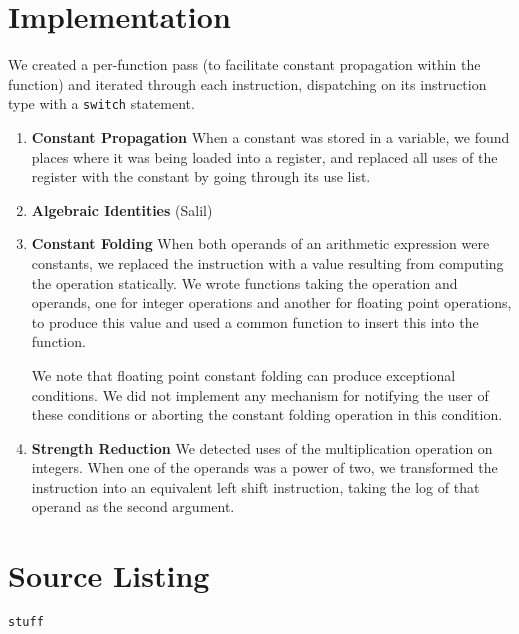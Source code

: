 \documentclass[12pt]{article}
\begin{document}
\section{Implementation}
We created a per-function pass (to facilitate constant propagation within the function) and iterated through each instruction, dispatching on its instruction type with a \texttt{switch} statement.
\begin{enumerate}
\item \textbf{Constant Propagation} When a constant was stored in a variable, we found places where it was being loaded into a register, and replaced all uses of the register with the constant by going through its use list. 
\item \textbf{Algebraic Identities} (Salil)
\item \textbf{Constant Folding} When both operands of an arithmetic expression were constants, we replaced the instruction with a value resulting from computing the operation statically. We wrote  functions taking the operation and operands, one for integer operations and another for floating point operations, to produce this value and used a common function to insert this into the function.

We note that floating point constant folding can produce exceptional conditions. We did not implement any mechanism for notifying the user of these conditions or aborting the constant folding operation in this condition.
\item \textbf{Strength Reduction} We detected uses of the multiplication operation on integers. When one of the operands was a power of two, we transformed the instruction into an equivalent left shift instruction, taking the log of that operand as the second argument.
\end{enumerate}
\section{Source Listing}
\begin{verbatim}
stuff
\end{verbatim}
\end{document}

